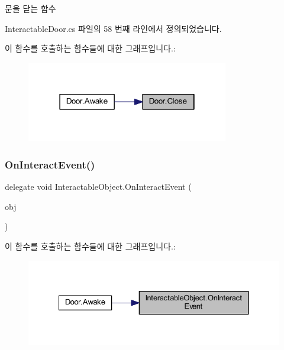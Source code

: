 문을 닫는 함수 



Interactable\+Door.\+cs 파일의 58 번째 라인에서 정의되었습니다.


\begin{DoxyCode}{0}

\end{DoxyCode}
이 함수를 호출하는 함수들에 대한 그래프입니다.\+:
\nopagebreak
\begin{figure}[H]
\begin{center}
\leavevmode
\includegraphics[width=250pt]{da/d30/class_door_aa7d854b8fb1c977551051f03cea151ce_icgraph}
\end{center}
\end{figure}
\mbox{\label{class_interactable_object_a70a579e4b09d53e6cb77b5222189d5eb}} 
\subsubsection{\texorpdfstring{OnInteractEvent()}{OnInteractEvent()}}
{\footnotesize\ttfamily delegate void Interactable\+Object.\+On\+Interact\+Event (\begin{DoxyParamCaption}\item[{Game\+Object}]{obj }\end{DoxyParamCaption})\hspace{0.3cm}{\ttfamily [inherited]}}

이 함수를 호출하는 함수들에 대한 그래프입니다.\+:
\nopagebreak
\begin{figure}[H]
\begin{center}
\leavevmode
\includegraphics[width=328pt]{d9/d55/class_interactable_object_a70a579e4b09d53e6cb77b5222189d5eb_icgraph}
\end{center}
\end{figure}
\mbox{\label{class_door_a12cc0e80dc33ddd336dccc52466c2c50}} 
